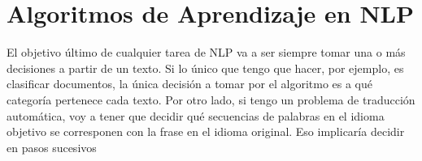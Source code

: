 \section{Algoritmos de Aprendizaje en NLP}

El objetivo último de cualquier tarea de NLP va a ser siempre tomar una o más decisiones a partir de un texto. Si lo único que tengo que hacer, por ejemplo, es clasificar documentos, la única decisión a tomar por el algoritmo es a qué categoría pertenece cada texto. Por otro lado, si tengo un problema de traducción automática, voy a tener que decidir qué secuencias de palabras en el idioma objetivo se corresponen con la frase en el idioma original. Eso implicaría decidir en pasos sucesivos 
